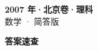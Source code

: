\documentclass[zihao=-4, a4paper]{ctexart}
\begin{document}
\begin{center}
  {\Large\bfseries 2007 年·北京卷·理科}\\[4pt]
  {\large 数学 · 简答版}
\end{center}
\medskip
{}

\clearpage
{}
\begin{center}{\Large\bfseries 答案速查}\end{center}
\medskip

\end{document}
